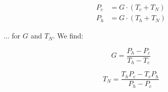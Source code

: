 \begin{equation} \label{eq:P_to_Ta_sys}
	\begin{split}
		P_c &= G \cdot (T_c + T_N) \\
		P_h &= G \cdot (T_h + T_N)
	\end{split}
\end{equation} 

... for $G$ and $T_N$. We find:


\begin{equation} \label{eq:G}
	G = \frac{P_h-P_c}{T_h-T_c}
\end{equation} 

\begin{equation} \label{eq:TN}
	T_N = \frac{T_h P_c-T_c P_h}{P_h-P_c}
\end{equation} 

